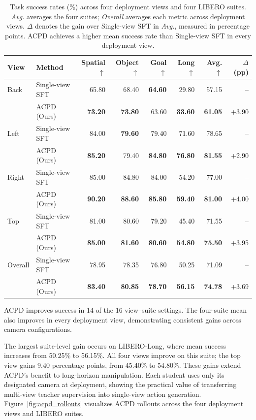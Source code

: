 \documentclass{ELSP}
\begin{document}
\begin{table}[!htbp]
\centering
\caption{Task success rates (\%) across four deployment views and four LIBERO suites. \textit{Avg.} averages the four suites; \textit{Overall} averages each metric across deployment views. $\Delta$ denotes the gain over Single-view SFT in \textit{Avg.}, measured in percentage points. ACPD achieves a higher mean success rate than Single-view SFT in every deployment view.}
\label{tab:main_results}
\begin{tabular*}{0.95\columnwidth}{@{\extracolsep{\fill}}llrrrrrr@{}}
\toprule
View & Method & Spatial $\uparrow$ & Object $\uparrow$
& Goal $\uparrow$ & Long $\uparrow$ & Avg. $\uparrow$ & $\Delta$ (pp) \\
\midrule
Back & Single-view SFT & 65.80 & 68.40 & \textbf{64.60} & 29.80 & 57.15 & -- \\
& ACPD (Ours) & \textbf{73.20} & \textbf{73.80} & 63.60 & \textbf{33.60}
& \textbf{61.05} & +3.90 \\
\midrule
Left & Single-view SFT & 84.00 & \textbf{79.60} & 79.40 & 71.60 & 78.65 & -- \\
& ACPD (Ours) & \textbf{85.20} & 79.40 & \textbf{84.80} & \textbf{76.80}
& \textbf{81.55} & +2.90 \\
\midrule
Right & Single-view SFT & 85.00 & 84.80 & 84.00 & 54.20 & 77.00 & -- \\
& ACPD (Ours) & \textbf{90.20} & \textbf{88.60} & \textbf{85.80} & \textbf{59.40}
& \textbf{81.00} & +4.00 \\
\midrule
Top & Single-view SFT & 81.00 & 80.60 & 79.20 & 45.40 & 71.55 & -- \\
& ACPD (Ours) & \textbf{85.00} & \textbf{81.60} & \textbf{80.60} & \textbf{54.80}
& \textbf{75.50} & +3.95 \\
\midrule
Overall & Single-view SFT & 78.95 & 78.35 & 76.80 & 50.25 & 71.09 & -- \\
& ACPD (Ours) & \textbf{83.40} & \textbf{80.85} & \textbf{78.70} & \textbf{56.15}
& \textbf{74.78} & +3.69 \\
\bottomrule
\end{tabular*}
\end{table}

ACPD improves success in 14 of the 16 view--suite settings.
The four-suite mean also improves in every deployment view,
demonstrating consistent gains across camera configurations.

The largest suite-level gain occurs on LIBERO-Long, where
mean success increases from 50.25\% to 56.15\%.
All four views improve on this suite; the top view gains
9.40 percentage points, from 45.40\% to 54.80\%.
These gains extend ACPD's benefit to long-horizon manipulation.
Each student uses only its designated camera at deployment,
showing the practical value of transferring multi-view teacher
supervision into single-view action generation.
Figure~\ref{fig:acpd_rollouts} visualizes ACPD rollouts across
the four deployment views and LIBERO suites.
\end{document}
